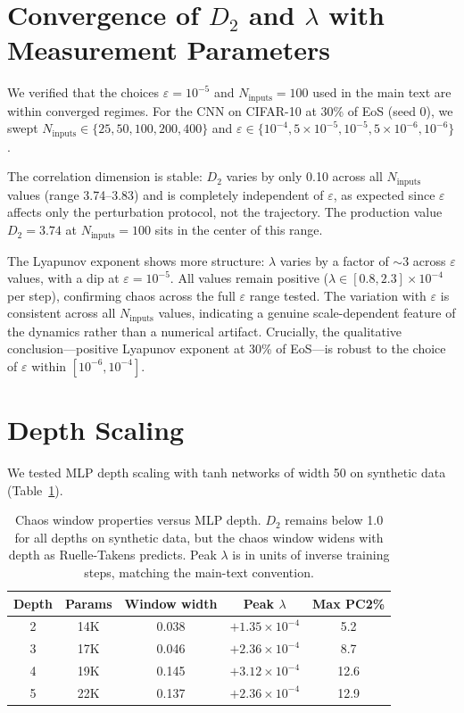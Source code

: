 \documentclass[aps,prl,twocolumn,superscriptaddress]{revtex4-2}
\begin{document}
\section{Convergence of $D_2$ and $\lambda$ with Measurement Parameters}

We verified that the choices $\varepsilon = 10^{-5}$ and $N_\text{inputs} = 100$ used in the main text are within converged regimes. For the CNN on CIFAR-10 at 30\% of EoS (seed 0), we swept $N_\text{inputs} \in \{25, 50, 100, 200, 400\}$ and $\varepsilon \in \{10^{-4}, 5{\times}10^{-5}, 10^{-5}, 5{\times}10^{-6}, 10^{-6}\}$.

The correlation dimension is stable: $D_2$ varies by only 0.10 across all $N_\text{inputs}$ values (range 3.74--3.83) and is completely independent of $\varepsilon$, as expected since $\varepsilon$ affects only the perturbation protocol, not the trajectory. The production value $D_2 = 3.74$ at $N_\text{inputs} = 100$ sits in the center of this range.

The Lyapunov exponent shows more structure: $\lambda$ varies by a factor of ${\sim}3$ across $\varepsilon$ values, with a dip at $\varepsilon = 10^{-5}$. All values remain positive ($\lambda \in [0.8, 2.3] \times 10^{-4}$ per step), confirming chaos across the full $\varepsilon$ range tested. The variation with $\varepsilon$ is consistent across all $N_\text{inputs}$ values, indicating a genuine scale-dependent feature of the dynamics rather than a numerical artifact. Crucially, the qualitative conclusion---positive Lyapunov exponent at 30\% of EoS---is robust to the choice of $\varepsilon$ within $[10^{-6}, 10^{-4}]$.

\section{Depth Scaling}

We tested MLP depth scaling with tanh networks of width 50 on synthetic data (Table~\ref{tab:depth}).

\begin{table}[h]
\caption{\label{tab:depth}%
Chaos window properties versus MLP depth. $D_2$ remains below 1.0 for all depths on synthetic data, but the chaos window widens with depth as Ruelle-Takens predicts. Peak $\lambda$ is in units of inverse training steps, matching the main-text convention.}
\begin{ruledtabular}
\begin{tabular}{ccccc}
Depth & Params & Window width & Peak $\lambda$ & Max PC2\%\\
\hline
2 & 14K & 0.038 & $+1.35 \times 10^{-4}$ & 5.2\\
3 & 17K & 0.046 & $+2.36 \times 10^{-4}$ & 8.7\\
4 & 19K & 0.145 & $+3.12 \times 10^{-4}$ & 12.6\\
5 & 22K & 0.137 & $+2.36 \times 10^{-4}$ & 12.9\\
\end{tabular}
\end{ruledtabular}
\end{table}
\end{document}
